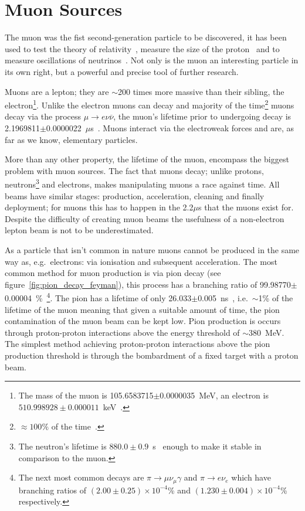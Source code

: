 \section{Muon Sources} %
\label{cha:high_intensity_muon_sources}
The muon was the fist second-generation particle to be discovered, it has been used to test the theory of relativity~\cite{rossi_hall_first_muons}, measure the size of the proton~\cite{proton_size} and to measure oscillations of neutrinos~\cite{t2k_cdr}. Not only is the muon an interesting particle in its own right, but a powerful and precise tool of further research. 

Muons are a lepton; they are \(\sim\)200 times more massive than their sibling, the electron\footnote{The mass of the muon is 105.6583715\(\pm\)0.0000035~MeV, an electron is \( 510.998928\pm0.000011 \)~keV~\cite{pdg}.}. Unlike the electron muons can decay and majority of the time\footnote{\(\approx100\%\) of the time~\cite{pdg}.} muons decay via the process \(\mu\rightarrow e\nu\overline{\nu}\), the muon's lifetime prior to undergoing decay is 2.1969811\( \pm \)0.0000022~\( \mu \)s~\cite{pdg}. Muons interact via the electroweak forces and are, as far as we know, elementary particles.

More than any other property, the lifetime of the muon, encompass the biggest problem with muon sources. The fact that muons decay; unlike protons, neutrons\footnote{The neutron's lifetime is \(880.0\pm0.9\)~s~\cite{pdg} enough to make it stable in comparison to the muon.} and electrons, makes manipulating muons a race against time. All beams have similar stages: production, acceleration, cleaning and finally deployment; for muons this has to happen in the 2.2\(\mu\)s that the muons exist for. Despite the difficulty of creating muon beams the usefulness of a non-electron lepton beam is not to be underestimated.

As a particle that isn't common in nature muons cannot be produced in the same way as, e.g.\ electrons: via ionisation and subsequent acceleration. The most common method for muon production is via pion decay (see figure~\ref{fig:pion_decay_feyman}), this process has a branching ratio of 99.98770$\pm$0.00004~\%~\cite{pdg}\footnote{The next most common decays are \( \pi\rightarrow\mu\nu_{\mu}\gamma \) and \( \pi\rightarrow e \nu_e \) which have branching ratios of \( (2.00\pm0.25)\times10^{-4} \)\% and \( (1.230\pm0.004)\times10^{-4} \)\% respectively.}. The pion has a lifetime of only 26.033\(\pm\)0.005~ns~\cite{pdg}, i.e.\ \( \sim \)1\% of the lifetime of the muon meaning that given a suitable amount of time, the pion contamination of the muon beam can be kept low. Pion production is occurs through proton-proton interactions above the energy threshold of \( \sim380 \)~MeV. The simplest method achieving proton-proton interactions above the pion production threshold is through the bombardment of a fixed target with a proton beam.


